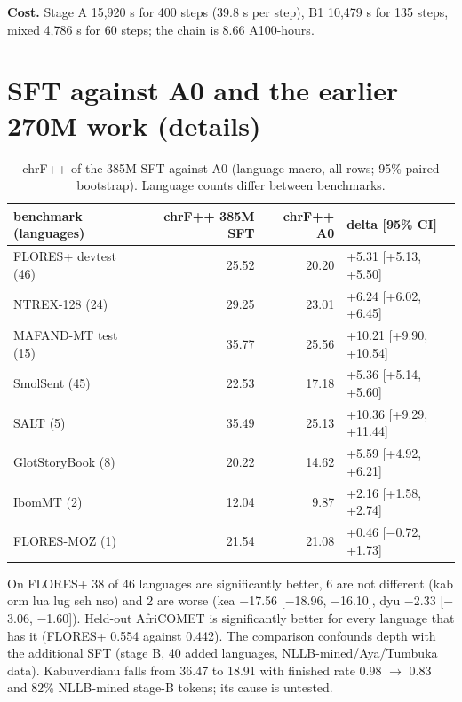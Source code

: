 \textbf{Cost.} Stage A 15,920 s for 400 steps (39.8 s per step), B1 10,479 s for 135 steps, mixed 4,786 s for 60 steps; the chain is 8.66 A100-hours. 

\section{SFT against A0 and the earlier 270M work (details)}\label{app:sft}

\begin{table}[t]
\centering\small
\setlength{\tabcolsep}{4pt}
\caption{chrF++ of the 385M SFT against A0 (language macro, all rows; 95\% paired bootstrap). Language counts differ between benchmarks.}\label{tab:sft_a0}
\begin{tabularx}{\linewidth}{@{}lrr>{\raggedright\arraybackslash}X@{}}
\toprule
benchmark (languages) & chrF++ 385M SFT & chrF++ A0 & delta [95\% CI] \\
\midrule
FLORES+ devtest (46) & 25.52 & 20.20 & +5.31 [+5.13, +5.50] \\
NTREX-128 (24) & 29.25 & 23.01 & +6.24 [+6.02, +6.45] \\
MAFAND-MT test (15) & 35.77 & 25.56 & +10.21 [+9.90, +10.54] \\
SmolSent (45) & 22.53 & 17.18 & +5.36 [+5.14, +5.60] \\
SALT (5) & 35.49 & 25.13 & +10.36 [+9.29, +11.44] \\
GlotStoryBook (8) & 20.22 & 14.62 & +5.59 [+4.92, +6.21] \\
IbomMT (2) & 12.04 & 9.87 & +2.16 [+1.58, +2.74] \\
FLORES-MOZ (1) & 21.54 & 21.08 & +0.46 [\ensuremath{-}0.72, +1.73] \\
\bottomrule
\end{tabularx}
\end{table}

On FLORES+ 38 of 46 languages are significantly better, 6 are not different (kab orm lua lug seh nso) and 2 are worse (kea \ensuremath{-}17.56 [\ensuremath{-}18.96, \ensuremath{-}16.10], dyu \ensuremath{-}2.33 [\ensuremath{-}3.06, \ensuremath{-}1.60]). Held-out AfriCOMET is significantly better for every language that has it (FLORES+ 0.554 against 0.442). The comparison confounds depth with the additional SFT (stage B, 40 added languages, NLLB-mined/Aya/Tumbuka data). Kabuverdianu falls from 36.47 to 18.91 with finished rate 0.98 $\to$ 0.83 and 82\% NLLB-mined stage-B tokens; its cause is untested. 

